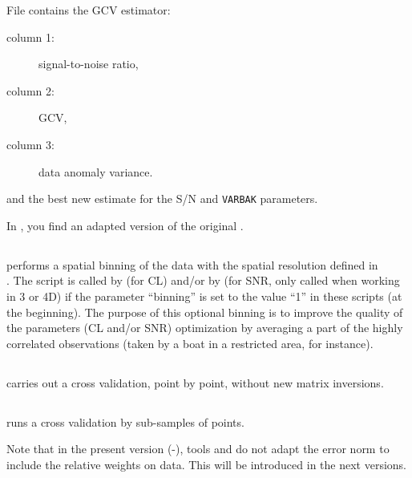 File  contains the GCV estimator:
\begin{description}
\item[column 1:] signal-to-noise ratio, 
\item[column 2:] GCV,
\item[column 3:] data anomaly variance.
\end{description}  
and  the best new estimate for the S/N and \texttt{VARBAK} parameters.

In , you find an adapted version of the original .

\subsection{}

 performs a spatial binning of the data with the spatial resolution defined in \\ . 
The script is called by  (for CL) and/or by  
(for SNR, only called when working in 3 or 4D) 
if the parameter ``binning'' is set to the value
``1'' in these scripts (at the beginning). The purpose of this optional binning is to improve the quality 
of the parameters (CL and/or SNR) optimization by averaging a part of the highly correlated observations 
(taken by a boat in a restricted area, for instance).  

\subsection{}

 carries out a cross validation, point by point, without new matrix inversions. 

\subsection{}

 runs a cross validation by sub-samples of points.


Note that in the present version (\diva-\divaversion), tools   and   
do not adapt the error norm to include the relative weights on data. This will be introduced in the next versions.

